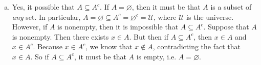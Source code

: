 \documentclass[11pt,letterpaper]{article}
\begin{document}
\begin{enumerate}[(a)]
\item Yes, it possible that $A \subseteq A^c$. If $A= \varnothing$, then it must be that $A$ is a subset of \textit{any} set. In particular, $A= \varnothing \subseteq A^c= \varnothing^c= \mathcal{U}$, where $\mathcal{U}$ is the universe. However, if $A$ is nonempty, then it is impossible that $A \subseteq A^c$. Suppose that $A$ is nonempty. Then there exists $x \in A$. But then if $A \subseteq A^c$, then $x \in A$ and $x \in A^c$. Because $x \in A^c$, we know that $x \notin A$, contradicting the fact that $x \in A$. So if $A \subseteq A^c$, it must be that $A$ is empty, i.e. $A= \varnothing$. 
\end{enumerate}
\end{document}
